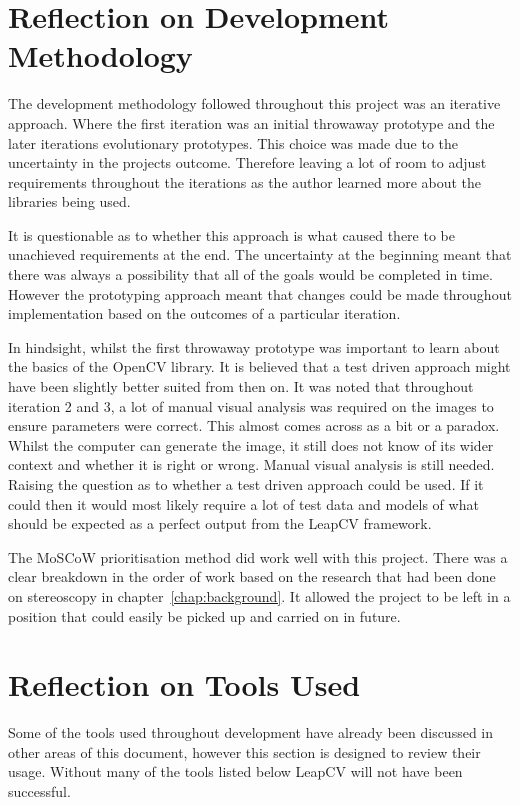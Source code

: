 \documentclass[11pt,oneside]{report}
\begin{document}
	\section{Reflection on Development Methodology}
		The development methodology followed throughout this project was an iterative approach.
		Where the first iteration was an initial throwaway prototype and the later iterations evolutionary prototypes.
		This choice was made due to the uncertainty in the projects outcome.
		Therefore leaving a lot of room to adjust requirements throughout the iterations as the author learned more about the libraries being used.
		
		It is questionable as to whether this approach is what caused there to be unachieved requirements at the end.
		The uncertainty at the beginning meant that there was always a possibility that all of the goals would be completed in time.
		However the prototyping approach meant that changes could be made throughout implementation based on the outcomes of a particular iteration.
		
		In hindsight, whilst the first throwaway prototype was important to learn about the basics of the OpenCV library.
		It is believed that a test driven approach might have been slightly better suited from then on.
		It was noted that throughout iteration 2 and 3, a lot of manual visual analysis was required on the images to ensure parameters were correct.
		This almost comes across as a bit or a paradox.
		Whilst the computer can generate the image, it still does not know of its wider context and whether it is right or wrong.
		Manual visual analysis is still needed.
		Raising the question as to whether a test driven approach could be used.
		If it could then it would most likely require a lot of test data and models of what should be expected as a perfect output from the LeapCV framework.
		
		The MoSCoW prioritisation method did work well with this project.
		There was a clear breakdown in the order of work based on the research that had been done on stereoscopy in chapter~\ref{chap:background}.
		It allowed the project to be left in a position that could easily be picked up and carried on in future.
		
	\section{Reflection on Tools Used}
		Some of the tools used throughout development have already been discussed in other areas of this document, however this section is designed to review their usage.
		Without many of the tools listed below LeapCV will not have been successful.
\end{document}
